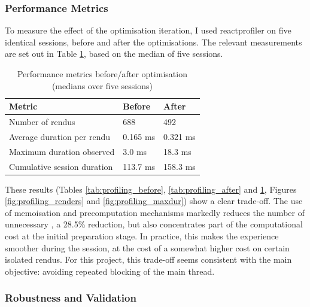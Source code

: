 \subsubsection{Performance Metrics}

To measure the effect of the optimisation iteration, I used \gls{reactprofiler} on five identical sessions, before and after the optimisations. The relevant measurements are set out in Table \ref{tab:metriques_performance}, based on the median of five sessions.

\begin{table}[H]
    \centering
    \caption{Performance metrics before/after optimisation (medians over five sessions)}
    \renewcommand{\arraystretch}{1.4}
    \begin{tabular}{p{6cm} p{3cm} p{3cm}}
        \hline
        \textbf{Metric} & \textbf{Before} & \textbf{After} \\
        \hline
        Number of \glspl{rendu} & 688 & 492 \\
        \addlinespace
        Average duration per \gls{rendu} & 0.165 ms & 0.321 ms \\
        \addlinespace
        Maximum duration observed & 3.0 ms & 18.3 ms \\
        \addlinespace
        Cumulative session duration & 113.7 ms & 158.3 ms \\
        \hline
    \end{tabular}
    \label{tab:metriques_performance}
\end{table}

These results (Tables \ref{tab:profiling_before}, \ref{tab:profiling_after} and \ref{tab:metriques_performance}, Figures \ref{fig:profiling_renders} and \ref{fig:profiling_maxdur}) show a clear trade-off. The use of \gls{memoisation} and precomputation mechanisms markedly reduces the number of unnecessary , a 28.5\% reduction, but also concentrates part of the computational cost at the initial preparation stage. In practice, this makes the experience smoother during the session, at the cost of a somewhat higher cost on certain isolated \glspl{rendu}. For this project, this trade-off seems consistent with the main objective: avoiding repeated blocking of the main thread.



\subsubsection{Robustness and Validation}

